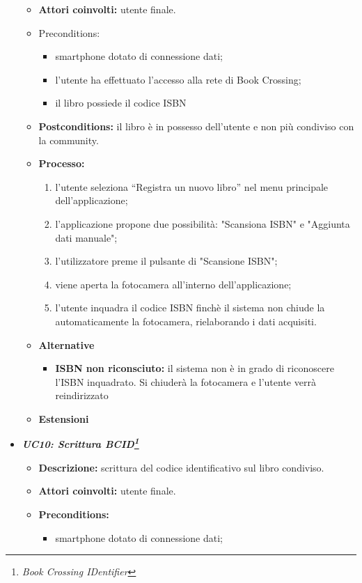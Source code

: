 \begin{itemize}
\begin{itemize}
		\item \textbf{Attori coinvolti:} utente finale.
		\item {Preconditions:} 
		\begin{itemize}
			\item smartphone dotato di connessione dati;
			\item l’utente ha effettuato l’accesso alla rete di Book Crossing;
			\item il libro possiede il codice ISBN
		\end{itemize}
		\item \textbf{Postconditions:} il libro è in possesso dell'utente e non più condiviso con la community.
		\item \textbf{Processo:}
		\begin{enumerate}
			\item l’utente seleziona “Registra un nuovo libro” nel menu principale dell’applicazione;
			\item l’applicazione propone due possibilità: "Scansiona ISBN" e "Aggiunta dati manuale";
			\item l'utilizzatore preme il pulsante di "Scansione ISBN";
			\item viene aperta la fotocamera all'interno dell'applicazione;
			\item l'utente inquadra il codice ISBN finchè il sistema non chiude la automaticamente la fotocamera, rielaborando i dati acquisiti.
		\end{enumerate}
		\item \textbf{Alternative}
		\begin{itemize}
			\item \textbf{ISBN non riconsciuto:} il sistema non è in grado di riconoscere l'ISBN inquadrato. Si chiuderà la fotocamera e l'utente verrà reindirizzato 
		\end{itemize}
		\item \textbf{Estensioni}
	\end{itemize}
	\item \textbf{\textit{UC10: Scrittura BCID\footnote{\textit{Book Crossing IDentifier}}}}
	\begin{itemize}
		\item \textbf{Descrizione:} scrittura del codice identificativo sul libro condiviso.
		\item \textbf{Attori coinvolti:} utente finale.
		\item \textbf{Preconditions:}
		\begin{itemize}
			\item smartphone dotato di connessione dati;

\end{itemize}
\end{itemize}
\end{itemize}

